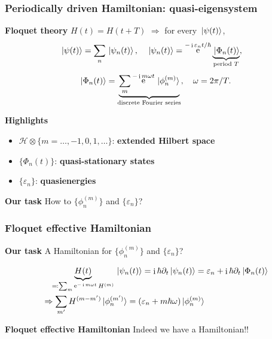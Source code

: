 \documentclass[t]{beamer}
\DeclareMathOperator{\ee}{e}
\DeclareMathOperator{\ii}{i}
\newcommand{\concept}[1]{\textbf{#1}}
\begin{document}
\begin{frame}
\frametitle{Periodically driven Hamiltonian: quasi-eigensystem}

\textbf{Floquet theory} $H(t) = H(t + T)$ $\Rightarrow$ 
for every $\ket*{\psi(t)}$, 
\begin{equation}
    \begin{aligned}
        &\ket*{\psi(t)} = \sum_n \ket*{\psi_n(t)} , \quad 
        \ket*{\psi_n(t)} = \ee^{- \ii \varepsilon_n t / \hbar} \underbrace{
            \ket*{\Phi_n(t)}
        }_\text{period $T$} ,
    \end{aligned}
\end{equation}
\begin{equation}
    \ket*{\Phi_n(t)} = \underbrace{\sum_m \ee^{- \ii m \omega t} \ket*{\phi_n^{(m)}}}_{\text{discrete Fourier series}} , \quad 
    \omega = 2\pi / T. 
\end{equation}

\textbf{Highlights} 
\begin{itemize}
    \item $\mathcal{H} \otimes \{m= \ldots, -1, 0, 1, \ldots \}$: \concept{extended Hilbert space}
    \item $\{\Phi_n(t)\}$: \concept{quasi-stationary states}
    \item $\{\varepsilon_n\}$: \concept{quasienergies}
\end{itemize}

\vspace{0.5cm}

\textbf{Our task} How to  $\{ \phi_n^{(m)} \}$ and $\{ \varepsilon_n \}$? 

\end{frame}

\begin{frame}
\frametitle{Floquet effective Hamiltonian}

\textbf{Our task} A Hamiltonian for $\{ \phi_n^{(m)} \}$ and $\{ \varepsilon_n \}$? 

\[
    \begin{aligned}
        &\quad 
        \underbrace{H(t)}_{\eqqcolon \sum_m \ee^{- \ii m \omega t} H^{(m)}} \ket*{\psi_n(t)} = \ii \hbar \partial_t \ket*{\psi_n(t)} = \varepsilon_n + \ii \hbar \partial_t \ket*{\Phi_n(t)} \\
        &\Rightarrow \sum_{m'} H^{(m - m')} \ket*{\phi^{(m')}_n} = (\varepsilon_n + m \hbar \omega) \ket*{\phi_n^{(m)}} 
    \end{aligned}
\]

\textbf{Floquet effective Hamiltonian} Indeed we have a Hamiltonian!!


\end{frame}
\end{document}
